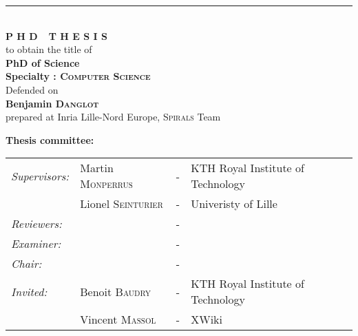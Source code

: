 \begin{titlepage}
\begin{center}
\vspace*{-2cm}
\begin{figure}[!htbp]
  \begin{center}
  \end{center}
\end{figure}
\hrule


\vspace*{0.9cm}
 \\
\vspace*{0.9cm}
\vspace*{0.5cm}
\noindent \Huge \textbf{P H D\ \ T H E S I S} \\
\vspace*{0.3cm}
\noindent \large {to obtain the title of} \\
\vspace*{0.3cm}
\noindent \LARGE \textbf{PhD of Science} \\
\vspace*{0.3cm}
\noindent \Large \textbf{Specialty : \textsc{Computer Science}}\\
\vspace*{0.4cm}
\noindent \large {Defended on \\}
\noindent \LARGE \textbf{Benjamin \textsc{Danglot}} \\
\vspace*{0.9cm}
\noindent \Large prepared at Inria Lille-Nord Europe, \textsc{Spirals} Team\\
\vspace*{0.5cm}
\end{center}
\noindent \large \textbf{Thesis committee:} \\
\begin{center}
\noindent \large 
\begin{tabular}{llcl}
      \textit{Supervisors:}	& Martin \textsc{Monperrus}	& - & KTH Royal Institute of Technology \\
      & Lionel \textsc{Seinturier}	& - & Univeristy of Lille \\
      \textit{Reviewers:} &  & - & \\
      \textit{Examiner:} &  & - & \\
      \textit{Chair:} &  & - & \\
      \textit{Invited:}	& Benoit \textsc{Baudry} & - &  KTH Royal Institute of Technology\\
      & Vincent \textsc{Massol} & - &  XWiki
\end{tabular}
\end{center}
\end{titlepage}
\sloppy

\titlepage
